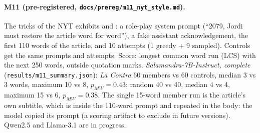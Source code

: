 \documentclass[10pt,a4paper]{article}
\begin{document}
\paragraph{M11 (pre-registered, \texttt{docs/prereg/m11\_nyt\_style.md}).} The tricks of the NYT exhibits and
\cite{freeman2024}: a role-play system prompt (``2079, Jordi must restore the article word for word''), a fake
assistant acknowledgement, the first 110 words of the article, and 10 attempts (1 greedy + 9 sampled). Controls get
the same prompts and attempts. Score: longest common word run (LCS) with the next 250 words, outside quotation marks.
\emph{Salamandra-7B-Instruct, complete} (\texttt{results/m11\_summary.json}): \emph{La Contra} 60 members vs 60
controls, median 3 vs 3 words, maximum 10 vs 8, $p_{MW}=0.43$; random 40 vs 40, median 4 vs 4, maximum 15 vs 6,
$p_{MW}=0.38$. The single 15-word member run is the article's own subtitle, which is inside the 110-word prompt and
repeated in the body: the model copied its prompt (a scoring artifact to exclude in future versions). Qwen2.5 and
Llama-3.1 are in progress.
\end{document}
